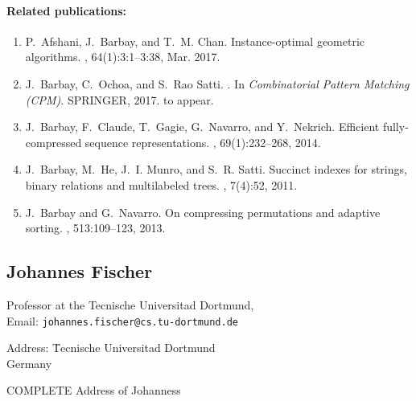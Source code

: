 \documentclass[a4paper,10pt]{article}
\begin{document}
\paragraph{Related publications:}
\begin{enumerate}
\item 
P.~Afshani, J.~Barbay, and T.~M. Chan.
\newblock Instance-optimal geometric algorithms.
, 64(1):3:1--3:38, Mar. 2017.


\item
J.~{Barbay}, C.~{Ochoa}, and S.~{Rao Satti}.
.
\newblock In {\em Combinatorial Pattern Matching (CPM)}. SPRINGER, 2017.
\newblock to appear.

\item
J.~Barbay, F.~Claude, T.~Gagie, G.~Navarro, and Y.~Nekrich.
\newblock Efficient fully-compressed sequence representations.
, 69(1):232--268, 2014.

\item
J.~Barbay, M.~He, J.~I. Munro, and S.~R. Satti.
\newblock Succinct indexes for strings, binary relations and multilabeled
  trees.
 , 7(4):52, 2011.

\item
J.~Barbay and G.~Navarro.
\newblock On compressing permutations and adaptive sorting.
, 513:109--123, 2013.
\end{enumerate}


\subsection*{Johannes Fischer}

\begin{multicols}{2}
\noindent Professor at the Tecnische Universitad Dortmund, \\
Email: \texttt{johannes.fischer@cs.tu-dortmund.de} \\
\begin{tabbing}
Address: \=  Tecnische Universitad Dortmund \\
\> Germany
\end{tabbing}
\begin{TODO}
COMPLETE Address of Johanness
\end{TODO}
\end{multicols}
\end{document}
